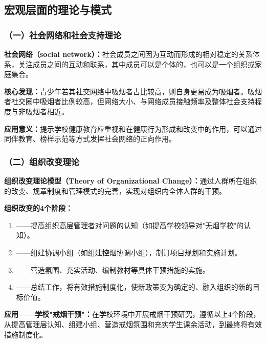 \subsection{宏观层面的理论与模式}

\subsubsection{（一）社会网络和社会支持理论}

\begin{keybox}
\textbf{社会网络（social network）：}社会成员之间因为互动而形成的相对稳定的关系体系，关注成员之间的互动和联系，其中成员可以是个体的，也可以是一个组织或家庭集合。

\textbf{核心发现：}青少年若其社交网络中吸烟者占比较高，则自身更易成为吸烟者。吸烟者社交圈中吸烟者比例较高，但网络大小、与网络成员接触频率及整体社会支持程度与非吸烟者相近。

\textbf{应用意义：}提示学校健康教育应重视和在健康行为形成和改变中的作用，可以通过同伴教育、榜样示范等方式发挥社会网络的正向作用。
\end{keybox}

\subsubsection{（二）组织改变理论}

\begin{keybox}
\textbf{组织改变理论模型（Theory of Organizational Change）：}通过人群所在组织的改变、规章制度和管理模式的完善，实现对组织内全体人群的干预。

\textbf{组织改变的4个阶段：}
\begin{enumerate}[leftmargin=*]
    \item {}——提高组织高层管理者对问题的认知（如提高学校领导对"无烟学校"的认知）。
    \item {}——组建协调小组（如组建控烟协调小组），制订项目规划和实施计划。
    \item {}——营造氛围、充实活动、编制教材等具体干预措施的实施。
    \item {}——总结工作，将有效措施制度化，使新政策变为确定的、融入组织的新的目标价值。
\end{enumerate}

\textbf{应用——学校"戒烟干预"：}在学校环境中开展戒烟干预研究，遵循以上4个阶段，从提高管理层认知、组建小组、营造戒烟氛围和充实学生课余活动，到最终将有效措施制度化。
\end{keybox}

